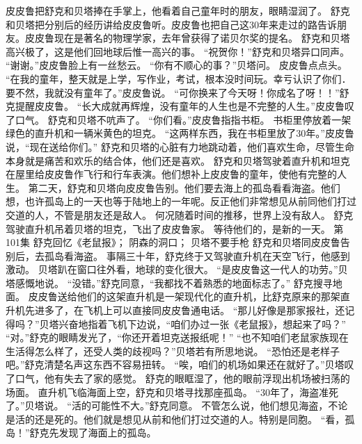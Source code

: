 \documentclass[a4paper,12pt,UTF8,twoside]{ctexbook}
\begin{document}
        皮皮鲁把舒克和贝塔捧在手掌上，他看着自己童年时的朋友，眼睛湿润了。 
        舒克和贝塔把分别后的经历讲给皮皮鲁听。皮皮鲁也把自己这30年来走过的路告诉朋友。皮皮鲁现在是著名的物理学家，去年曾获得了诺贝尔奖的提名。 
        舒克和贝塔高兴极了，这是他们回地球后惟一高兴的事。 
        “祝贺你！”舒克和贝塔异口同声。 
        “谢谢。”皮皮鲁脸上有一丝愁云。 
        “你有不顺心的事？”贝塔问。 
        皮皮鲁点点头。 
        “在我的童年，整天就是上学，写作业，考试，根本没时间玩。幸亏认识了你们．要不然，我就没有童年了。”皮皮鲁说。 
        “可你换来了今天呀！你成名了呀！！”舒克提醒皮皮鲁。 
        “长大成就再辉煌，没有童年的人生也是不完整的人生。”皮皮鲁叹了口气。 
        舒克和贝塔不吭声了。 
        “你们看。”皮皮鲁指指书柜。 
        书柜里停放着一架绿色的直升机和一辆米黄色的坦克。 
        “这两样东西，我在书柜里放了30年。”皮皮鲁说，“现在送给你们。” 
        舒克和贝塔的心脏有力地跳动着，他们喜欢生命，尽管生命本身就是痛苦和欢乐的结合体，他们还是喜欢。 
        舒克和贝塔驾驶着直升机和坦克在屋里给皮皮鲁作飞行和行车表演。他们想补上皮皮鲁的童年，使他有完整的人生。 
        第二天，舒克和贝塔向皮皮鲁告别。他们要去海上的孤岛看看海盗。他们想，也许孤岛上的一天也等于陆地上的一年呢。反正他们非常想见从前同他们打过交道的人，不管是朋友还是敌人。 
        何况随着时间的推移，世界上没有敌人。 
        舒克驾驶直升机吊着贝塔的坦克，飞出了皮皮鲁家。 
        等待他们的，是新的一天。   第101集 
        舒克回忆《老鼠报》； 
        阴森的洞口； 
        贝塔不要手枪   
        舒克和贝塔同皮皮鲁告别后，去孤岛看海盗。 
        事隔三十年，舒克终于又驾驶直升机在天空飞行，他感到激动。 
        贝塔趴在窗口往外看，地球的变化很大。 
        “是皮皮鲁这一代人的功劳。”贝塔感慨地说。 
        “没错。”舒克同意，“我都找不着熟悉的地面标志了。” 
        舒克搜寻地面。 
        皮皮鲁送给他们的这架直升机是一架现代化的直升机，比舒克原来的那架直升机先进多了，在飞机上可以直接同皮皮鲁通电话。 
        “那儿好像是那家报社，还记得吗？”贝塔兴奋地指着飞机下边说，“咱们办过一张《老鼠报》，想起来了吗？” 
        “对。”舒克的眼睛发光了，“你还开着坦克送报纸呢！” 
        “也不知咱们老鼠家族现在生活得怎么样了，还受人类的歧视吗？”贝塔若有所思地说。 
        “恐怕还是老样子吧。”舒克清楚名声这东西不容易扭转。 
        “唉，咱们的机场如果还在就好了。”贝塔叹了口气，他有失去了家的感觉。 
        舒克的眼眶湿了，他的眼前浮现出机场被扫荡的场面。 
        直升机飞临海面上空，舒克和贝塔寻找那座孤岛。 
        “30年了，海盗准死了。”贝塔说。 
        “活的可能性不大。”舒克同意。 
        不管怎么说，他们想见海盗，不论是活的还是死的。他们就是想见从前和他们打过交道的人。特别是同胞。 
        “看，孤岛！”舒克先发现了海面上的孤岛。 
\end{document}
